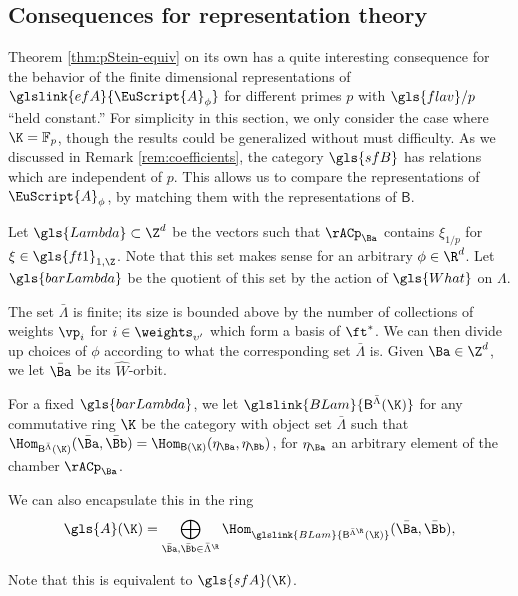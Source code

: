 \subsection{Consequences for representation theory}
\label{sec:cons-repr-theory}
Theorem \ref{thm:pStein-equiv} on its own has a quite interesting
consequence for  the behavior of the finite dimensional
representations of $\glslink{efA}{\EuScript{A}_\phi}$ for
different primes $p$ with  $\gls{flav}/p$  ``held constant.''  For simplicity in this section, we only consider the case where $\K=\mathbb{F}_p$, though the results could be
generalized without must difficulty.  As we discussed in Remark \ref{rem:coefficients}, the
category $\gls{sfB}$ has relations which are independent of $p$.
This allows us to compare the representations of $\EuScript{A}_\phi$,
by matching them with the representations of $\mathsf{B}.$ 


\begin{definition}\label{def:Lambda}
  Let $\gls{Lambda}\subset \Z^{d}$ be the vectors such that $\rACp_{\Ba}$
  contains $\xi_{1/p}$ for $\xi\in \gls{ft1}_{1,\Z}$.  Note that this set
  makes sense for an arbitrary $\phi \in \R^{d}$.  Let $\gls{barLambda}$ be the quotient of this set by
  the action of $\gls{What}$ on $\Lambda$.
\end{definition}
The set $\bar \Lambda$ is finite; its size is bounded above by the number
of collections of weights $\vp_i$ for $i\in \weights_{\upsilon'}$ which form a basis of $\ft^*$.   We
can then divide up choices of $\phi$ according to what the
corresponding set $\bar \Lambda$ is.  Given  $\Ba\in \Z^d$, we let
$\bar{\Ba}$ be its $\widehat{W}$-orbit.
\begin{definition}\label{def:BLam}
  For a fixed $\gls{barLambda}$, we let $\glslink{BLam}{\mathsf{B}^{\bar \Lambda}(\K)}$
  for any commutative ring $\K$ be the category with object set
  $\bar \Lambda$ such that
  $\Hom_{\mathsf{B}^{\bar
      \Lambda}(\K)}(\bar{\Ba},\bar{\Bb})=\Hom_{\mathsf{B}(\K)}(\eta_\Ba,\eta_\Bb)$,
  for $\eta_\Ba$ an arbitrary element of the chamber $\rACp_{\Ba}$.

  We can also encapsulate this in the ring
  \begin{equation}
  \gls{A}(\K)=\bigoplus_{\bar{\Ba},\bar{\Bb}\in
    \bar\Lambda^{\R}}\Hom_{\glslink{BLam}{\mathsf{B}^{\bar{\Lambda}^{\R}}(\K)}}(\bar{\Ba},\bar{\Bb}),\label{eq:A-def}
\end{equation}

\end{definition}
Note that this is
equivalent to $\gls{sfA}(\K)$.  

